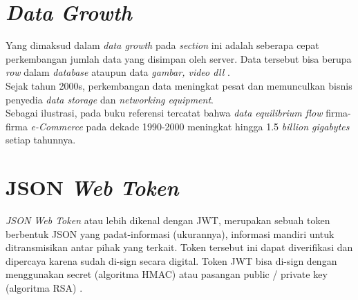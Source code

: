 	\section{\textit{Data Growth}}
	Yang dimaksud dalam \textit{data growth} pada \textit{section} ini adalah seberapa cepat perkembangan jumlah data yang disimpan oleh server. Data tersebut bisa berupa \textit{row} dalam \textit{database} ataupun data \textit{gambar, video dll} \cite{insidebigdata_exponential_2017}.
	\\ \indent
	Sejak tahun 2000s, perkembangan data meningkat pesat dan memunculkan bisnis penyedia \textit{data storage} dan \textit{networking equipment}.
	\\ \indent Sebagai ilustrasi, pada buku referensi tercatat bahwa \textit{data equilibrium flow} firma-firma \textit{e-Commerce} pada dekade 1990-2000 meningkat hingga 1.5 \textit{billion gigabytes} setiap tahunnya\cite{d._vanhoose_e-commerce_2011}.
	
	
	\section{JSON \textit{Web Token}}
	\textit{JSON Web Token }atau lebih dikenal dengan JWT, merupakan sebuah token berbentuk JSON yang padat-informasi (ukurannya), informasi mandiri untuk ditransmisikan antar pihak yang terkait. Token tersebut ini dapat diverifikasi dan dipercaya karena sudah di-sign secara digital. Token JWT bisa di-sign dengan menggunakan secret (algoritma HMAC) atau pasangan public / private key (algoritma RSA) \cite{noauthor_jwt_2016}.
	
